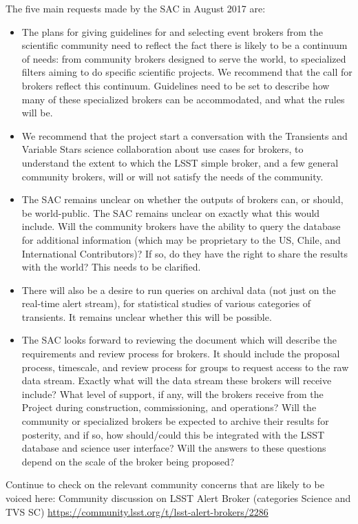 The five main requests made by the SAC in August 2017 are:
\begin{itemize}
\item The plans for giving guidelines for and selecting event brokers
  from the scientific community need to reflect the fact there is
  likely to be a continuum of needs: from community brokers designed
  to serve the world, to specialized filters aiming to do specific
  scientific projects.  We recommend that the call for brokers reflect
  this continuum. Guidelines need to be set to describe how many of these specialized
brokers can be accommodated, and what the rules will be.
\item We recommend that the project start a conversation with the
  Transients and Variable Stars science collaboration about use cases
  for brokers, to understand the extent to which the LSST simple
  broker, and a few general community brokers, will or will not
  satisfy the needs of the community. 
\item The SAC remains unclear on whether the outputs of brokers can, or should, be world-public. The SAC remains unclear on exactly what this would include. Will the community brokers have the ability to query the database for additional information (which may be proprietary to the US, Chile, and International Contributors)? If so, do they have the right to share the results with the world? This needs to be clarified.
\item There will also be a desire to run queries on archival data (not just on the real-time alert stream), for statistical studies of various categories of transients.  It remains unclear whether this will be possible.
\item The SAC looks forward to reviewing the document which will describe the requirements and review process for brokers. It should include the proposal process, timescale, and
review process for groups to request access to the raw data stream.
Exactly what will the data stream these brokers will receive include?
What level of support, if any, will the brokers receive from the
Project during construction, commissioning, and operations?  Will the
community or specialized brokers be expected to archive their results
for posterity, and if so, how should/could this be integrated with the
LSST database and science user interface?  Will the answers to these
questions depend on the scale of the broker being proposed?
\end{itemize}

Continue to check on the relevant community concerns that are likely to be voiced here:
Community discussion on LSST Alert Broker (categories Science and TVS SC)
\url{https://community.lsst.org/t/lsst-alert-brokers/2286}

